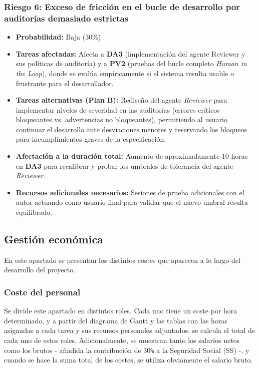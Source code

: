 \documentclass[11pt, letterpaper]{article}
\begin{document}
\subsubsection{Riesgo 6: Exceso de fricción en el bucle de desarrollo por auditorías demasiado estrictas}
\label{sec:riesgo6}
\begin{itemize}
    \item \textbf{Probabilidad:} Baja (30\%)
    \item \textbf{Tareas afectadas:} Afecta a \textbf{DA3} (implementación del agente Reviewer y sus políticas de auditoría) y a \textbf{PV2} (pruebas del bucle completo \textit{Human in the Loop}), donde se evalúa empíricamente si el sistema resulta usable o frustrante para el desarrollador.
    \item \textbf{Tareas alternativas (Plan B):} Rediseño del agente \textit{Reviewer} para implementar niveles de severidad en las auditorías (errores críticos bloqueantes vs. advertencias no bloqueantes), permitiendo al usuario continuar el desarrollo ante desviaciones menores y reservando los bloqueos para incumplimientos graves de la especificación.
    \item \textbf{Afectación a la duración total:} Aumento de aproximadamente 10 horas en \textbf{DA3} para recalibrar y probar los umbrales de tolerancia del agente \textit{Reviewer}.
    \item \textbf{Recursos adicionales necesarios:} Sesiones de prueba adicionales con el autor actuando como usuario final para validar que el nuevo umbral resulta equilibrado.
\end{itemize}

\newpage

\subsection{Gestión económica}
\label{sec:gestion_economica}
En este apartado se presentan los distintos costes que aparecen a lo largo del desarrollo del proyecto.

\subsubsection{Coste del personal}
\label{sec:coste_personal}
Se divide este apartado en distintos roles. Cada uno tiene un coste por hora determinado, y a partir del diagrama de Gantt y las tablas con las horas asignadas a cada tarea y sus recursos personales adjuntados, se calcula el total de cada uno de estos roles. Adicionalmente, se muestran tanto los salarios netos como los brutos - añadida la contribución de 30\verb|%| a la Seguridad Social (SS) -, y cuando se hace la suma total de los costes, se utiliza obviamente el salario bruto.
\end{document}

